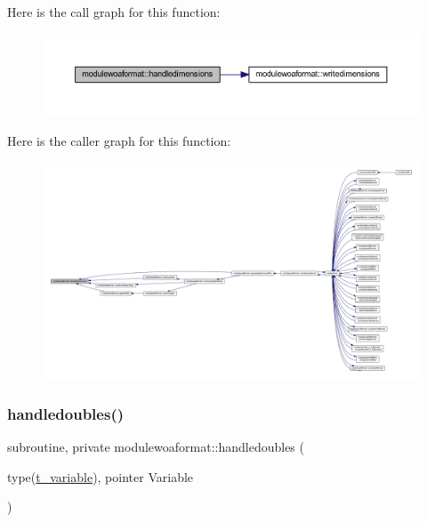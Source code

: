 Here is the call graph for this function\+:\nopagebreak
\begin{figure}[H]
\begin{center}
\leavevmode
\includegraphics[width=350pt]{namespacemodulewoaformat_a1755d2188a0690fff10f808cf9ecec9a_cgraph}
\end{center}
\end{figure}
Here is the caller graph for this function\+:\nopagebreak
\begin{figure}[H]
\begin{center}
\leavevmode
\includegraphics[width=350pt]{namespacemodulewoaformat_a1755d2188a0690fff10f808cf9ecec9a_icgraph}
\end{center}
\end{figure}
\mbox{\label{namespacemodulewoaformat_ad8813b60f60898f593061c4a41c50e3f}} 
\subsubsection{\texorpdfstring{handledoubles()}{handledoubles()}}
{\footnotesize\ttfamily subroutine, private modulewoaformat\+::handledoubles (\begin{DoxyParamCaption}\item[{type(\mbox{\hyperlink{structmodulewoaformat_1_1t__variable}{t\+\_\+variable}}), pointer}]{Variable }\end{DoxyParamCaption})\hspace{0.3cm}{\ttfamily [private]}}

